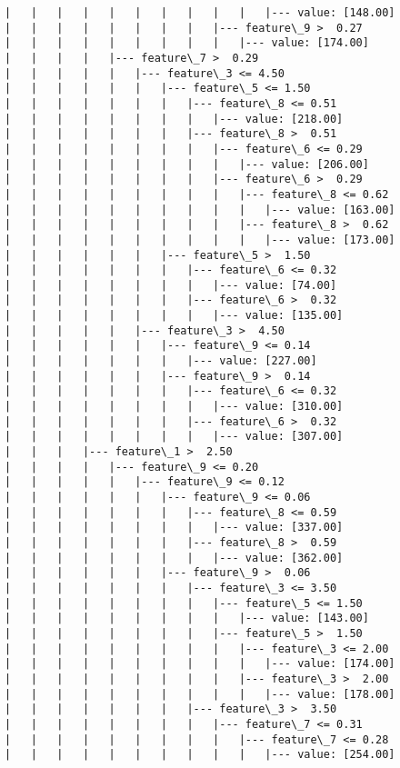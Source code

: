 \documentclass[11pt]{article}
\begin{document}
\begin{Verbatim}[commandchars=\\\{\}]
|   |   |   |   |   |   |   |   |   |   |--- value: [148.00]
|   |   |   |   |   |   |   |   |--- feature\_9 >  0.27
|   |   |   |   |   |   |   |   |   |--- value: [174.00]
|   |   |   |   |--- feature\_7 >  0.29
|   |   |   |   |   |--- feature\_3 <= 4.50
|   |   |   |   |   |   |--- feature\_5 <= 1.50
|   |   |   |   |   |   |   |--- feature\_8 <= 0.51
|   |   |   |   |   |   |   |   |--- value: [218.00]
|   |   |   |   |   |   |   |--- feature\_8 >  0.51
|   |   |   |   |   |   |   |   |--- feature\_6 <= 0.29
|   |   |   |   |   |   |   |   |   |--- value: [206.00]
|   |   |   |   |   |   |   |   |--- feature\_6 >  0.29
|   |   |   |   |   |   |   |   |   |--- feature\_8 <= 0.62
|   |   |   |   |   |   |   |   |   |   |--- value: [163.00]
|   |   |   |   |   |   |   |   |   |--- feature\_8 >  0.62
|   |   |   |   |   |   |   |   |   |   |--- value: [173.00]
|   |   |   |   |   |   |--- feature\_5 >  1.50
|   |   |   |   |   |   |   |--- feature\_6 <= 0.32
|   |   |   |   |   |   |   |   |--- value: [74.00]
|   |   |   |   |   |   |   |--- feature\_6 >  0.32
|   |   |   |   |   |   |   |   |--- value: [135.00]
|   |   |   |   |   |--- feature\_3 >  4.50
|   |   |   |   |   |   |--- feature\_9 <= 0.14
|   |   |   |   |   |   |   |--- value: [227.00]
|   |   |   |   |   |   |--- feature\_9 >  0.14
|   |   |   |   |   |   |   |--- feature\_6 <= 0.32
|   |   |   |   |   |   |   |   |--- value: [310.00]
|   |   |   |   |   |   |   |--- feature\_6 >  0.32
|   |   |   |   |   |   |   |   |--- value: [307.00]
|   |   |   |--- feature\_1 >  2.50
|   |   |   |   |--- feature\_9 <= 0.20
|   |   |   |   |   |--- feature\_9 <= 0.12
|   |   |   |   |   |   |--- feature\_9 <= 0.06
|   |   |   |   |   |   |   |--- feature\_8 <= 0.59
|   |   |   |   |   |   |   |   |--- value: [337.00]
|   |   |   |   |   |   |   |--- feature\_8 >  0.59
|   |   |   |   |   |   |   |   |--- value: [362.00]
|   |   |   |   |   |   |--- feature\_9 >  0.06
|   |   |   |   |   |   |   |--- feature\_3 <= 3.50
|   |   |   |   |   |   |   |   |--- feature\_5 <= 1.50
|   |   |   |   |   |   |   |   |   |--- value: [143.00]
|   |   |   |   |   |   |   |   |--- feature\_5 >  1.50
|   |   |   |   |   |   |   |   |   |--- feature\_3 <= 2.00
|   |   |   |   |   |   |   |   |   |   |--- value: [174.00]
|   |   |   |   |   |   |   |   |   |--- feature\_3 >  2.00
|   |   |   |   |   |   |   |   |   |   |--- value: [178.00]
|   |   |   |   |   |   |   |--- feature\_3 >  3.50
|   |   |   |   |   |   |   |   |--- feature\_7 <= 0.31
|   |   |   |   |   |   |   |   |   |--- feature\_7 <= 0.28
|   |   |   |   |   |   |   |   |   |   |--- value: [254.00]

\end{Verbatim}
\end{document}
